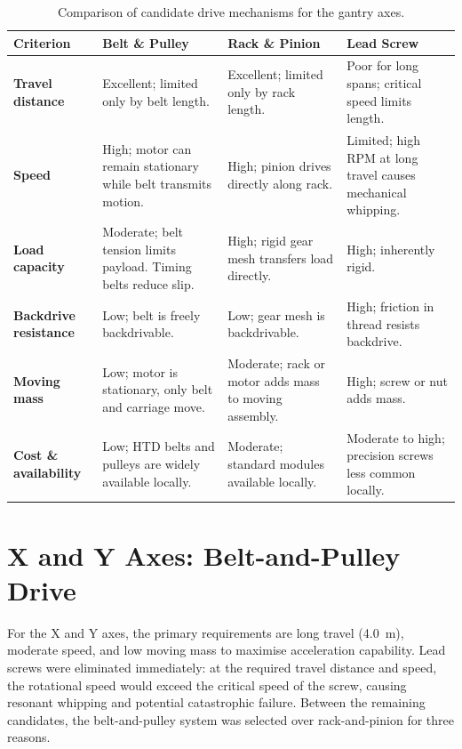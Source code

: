 \begin{table}[H]
    \centering
    \caption{Comparison of candidate drive mechanisms for the gantry axes.}
    \label{tab:drive_comparison}
    \renewcommand{\arraystretch}{1.3}
    \begin{tabular}{@{}p{2.5cm} p{3.5cm} p{3.5cm} p{3.5cm}@{}}
        \toprule
        \textbf{Criterion} & \textbf{Belt \& Pulley} & \textbf{Rack \& Pinion} & \textbf{Lead Screw} \\
        \midrule
        \textbf{Travel distance} & Excellent; limited only by belt length. & Excellent; limited only by rack length. & Poor for long spans; critical speed limits length. \\
        \hline
        \textbf{Speed} & High; motor can remain stationary while belt transmits motion. & High; pinion drives directly along rack. & Limited; high RPM at long travel causes mechanical whipping. \\
        \hline
        \textbf{Load capacity} & Moderate; belt tension limits payload. Timing belts reduce slip. & High; rigid gear mesh transfers load directly. & High; inherently rigid. \\
        \hline
        \textbf{Backdrive resistance} & Low; belt is freely backdrivable. & Low; gear mesh is backdrivable. & High; friction in thread resists backdrive. \\
        \hline
        \textbf{Moving mass} & Low; motor is stationary, only belt and carriage move. & Moderate; rack or motor adds mass to moving assembly. & High; screw or nut adds mass. \\
        \hline
        \textbf{Cost \& availability} & Low; HTD belts and pulleys are widely available locally. & Moderate; standard modules available locally. & Moderate to high; precision screws less common locally. \\
        \bottomrule
    \end{tabular}
\end{table}


\section{X and Y Axes: Belt-and-Pulley Drive}

For the X and Y axes, the primary requirements are long travel (\qty{4.0}{m}), moderate speed, and low moving mass to maximise acceleration capability. Lead screws were eliminated immediately: at the required travel distance and speed, the rotational speed would exceed the critical speed of the screw, causing resonant whipping and potential catastrophic failure. Between the remaining candidates, the belt-and-pulley system was selected over rack-and-pinion for three reasons.

